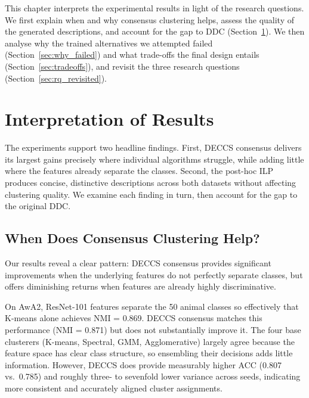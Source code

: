\label{chap:discussion}

This chapter interprets the experimental results in light of the research questions. We first explain when and why consensus clustering helps, assess the quality of the generated descriptions, and account for the gap to DDC (Section~\ref{sec:interpretation}). We then analyse why the trained alternatives we attempted failed (Section~\ref{sec:why_failed}) and what trade-offs the final design entails (Section~\ref{sec:tradeoffs}), and revisit the three research questions (Section~\ref{sec:rq_revisited}).

\section{Interpretation of Results}
\label{sec:interpretation}

The experiments support two headline findings. First, DECCS consensus delivers its largest gains precisely where individual algorithms struggle, while adding little where the features already separate the classes. Second, the post-hoc ILP produces concise, distinctive descriptions across both datasets without affecting clustering quality. We examine each finding in turn, then account for the gap to the original DDC.

\subsection{When Does Consensus Clustering Help?}

Our results reveal a clear pattern: DECCS consensus provides significant improvements when the underlying features do not perfectly separate classes, but offers diminishing returns when features are already highly discriminative.

On AwA2, ResNet-101 features separate the 50 animal classes so effectively that K-means alone achieves NMI = 0.869. DECCS consensus matches this performance (NMI = 0.871) but does not substantially improve it. The four base clusterers (K-means, Spectral, GMM, Agglomerative) largely agree because the feature space has clear class structure, so ensembling their decisions adds little information. However, DECCS does provide measurably higher ACC (0.807 vs.\ 0.785) and roughly three- to sevenfold lower variance across seeds, indicating more consistent and accurately aligned cluster assignments.

